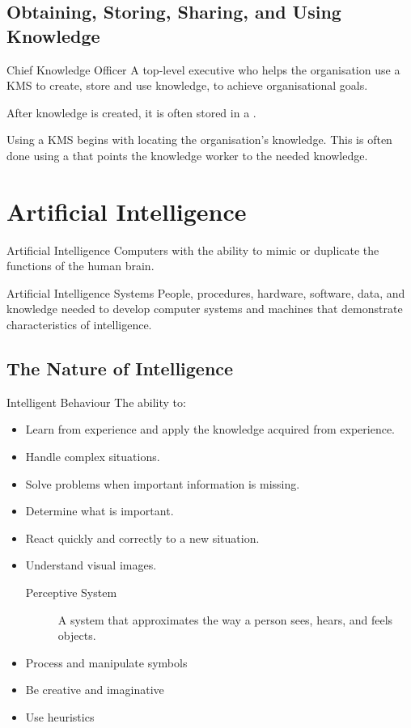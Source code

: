 \documentclass[\main/notes.tex]{subfiles}
\begin{document}
			\subsection{Obtaining, Storing, Sharing, and Using Knowledge}
				\begin{definition}{Chief Knowledge Officer}
					A top-level executive who helps the organisation use a KMS to create, store and use knowledge, to achieve organisational goals.
				\end{definition}
				After knowledge is created, it is often stored in a .

				Using a KMS begins with locating the organisation's knowledge. This is often done using a  that points the knowledge worker to the needed knowledge.

		\section{Artificial Intelligence}
			\begin{definition}{Artificial Intelligence}
				Computers with the ability to mimic or duplicate the functions of the human brain.
			\end{definition}
			\begin{definition}{Artificial Intelligence Systems}
				People, procedures, hardware, software, data, and knowledge needed to develop computer systems and machines that demonstrate characteristics of intelligence.
			\end{definition}
			\subsection{The Nature of Intelligence}
				\begin{definition}{Intelligent Behaviour}
					The ability to:
					\begin{itemize}
						\item Learn from experience and apply the knowledge acquired from experience.
						\item Handle complex situations.
						\item Solve problems when important information is missing.
						\item Determine what is important.
						\item React quickly and correctly to a new situation.
						\item Understand visual images.
							\begin{indentparagraph}
								\begin{description}
									\item[Perceptive System] A system that approximates the way a person sees, hears, and feels objects.
								\end{description}
							\end{indentparagraph}
						\item Process and manipulate symbols
						\item Be creative and imaginative
						\item Use heuristics
					\end{itemize}
				\end{definition}
			\pagebreak
\end{document}
